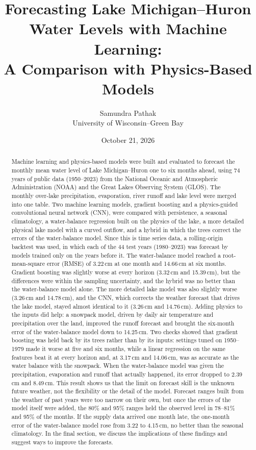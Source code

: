 \documentclass{article}
\title{Forecasting Lake Michigan--Huron Water Levels with Machine Learning:\\
A Comparison with Physics-Based Models}
\author{Samundra Pathak\\ University of Wisconsin--Green Bay}
\date{October 21, 2026}
\begin{document}
\maketitle

\begin{abstract}
Machine learning and physics-based models were built and evaluated to forecast the monthly mean
water level of Lake Michigan--Huron one to six months ahead, using 74 years of public data
(1950--2023) from the National Oceanic and Atmospheric Administration (NOAA) and the Great Lakes
Observing System (GLOS). The monthly over-lake precipitation, evaporation, river runoff and lake
level were merged into one table. Two machine learning models, gradient boosting and a
physics-guided convolutional neural network (CNN), were compared with persistence, a seasonal
climatology, a water-balance regression built on the physics of the lake, a more detailed
physical lake model with a curved outflow, and a hybrid in which the trees correct the errors of
the water-balance model. Since this is time series data, a rolling-origin backtest was used, in
which each of the 44 test years (1980--2023) was forecast by models trained only on the years
before it. The water-balance model reached a root-mean-square error (RMSE) of 3.22\,cm at one
month and 14.66\,cm at six months. Gradient boosting was slightly worse at every horizon
(3.32\,cm and 15.39\,cm), but the differences were within the sampling uncertainty, and the
hybrid was no better than the water-balance model alone. The more detailed lake model was also
slightly worse (3.26\,cm and 14.78\,cm), and the CNN, which corrects the weather forecast that
drives the lake model, stayed almost identical to it (3.26\,cm and 14.76\,cm). Adding physics to
the inputs did help: a snowpack model, driven by daily air temperature and precipitation over the
land, improved the runoff forecast and brought the six-month error of the water-balance model
down to 14.25\,cm. Two checks showed that gradient boosting was held back by its trees rather than
by its inputs: settings tuned on 1950--1979 made it worse at five and six months, while a linear
regression on the same features beat it at every horizon and, at 3.17\,cm and 14.06\,cm, was as
accurate as the water balance with the snowpack. When the
water-balance model was given the precipitation, evaporation and runoff that actually happened,
its error dropped to 2.39\,cm and 8.49\,cm. This result shows us that the limit on forecast skill
is the unknown future weather, not the flexibility or the detail of the model. Forecast ranges
built from the weather of past years were too narrow on their own, but once the errors of the
model itself were added, the 80\% and 95\% ranges held the observed level in 78--81\% and 95\% of
the months. If the supply data arrived one month late, the one-month error of the water-balance
model rose from 3.22 to 4.15\,cm, no better than the seasonal climatology. In the final section, we discuss the implications
of these findings and suggest ways to improve the forecasts.
\end{abstract}
\end{document}
